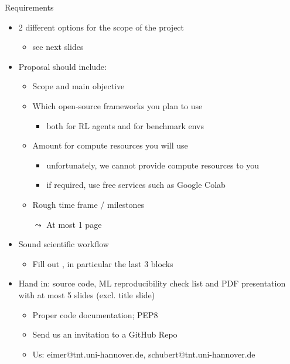 \documentclass[aspectratio=169]{../latex_main/tntbeamer}  %
\begin{document}
\begin{frame}[c]{Requirements}
	
	\begin{itemize}
		\item 2 different options for the scope of the project 
		\begin{itemize}
			\item see next slides
		\end{itemize}
		\pause
		\item Proposal should include:
			\begin{itemize}
				\item Scope and main objective
				\item Which open-source frameworks you plan to use
				\begin{itemize}
					\item both for RL agents and for benchmark envs
				\end{itemize}
				\item Amount for compute resources you will use
				\begin{itemize}
					\item unfortunately, we cannot provide compute resources to you
					\item if required, use free services such as Google Colab 
				\end{itemize}
				\item Rough time frame / milestones
				\item[$\leadsto$] At most 1 page
			\end{itemize}
		\pause
		\item Sound scientific  workflow
		\begin{itemize}
			\item Fill out , in particular the last 3 blocks
		\end{itemize}
		\pause
		\item Hand in: source code, ML reproducibility check list and PDF presentation with at most 5 slides (excl. title slide)
		\begin{itemize}
			\item Proper code documentation; PEP8
			\item Send us an invitation to a GitHub Repo
			\item Us: eimer@tnt.uni-hannover.de, schubert@tnt.uni-hannover.de
		\end{itemize}
	\end{itemize}
	
\end{frame}
\end{document}
